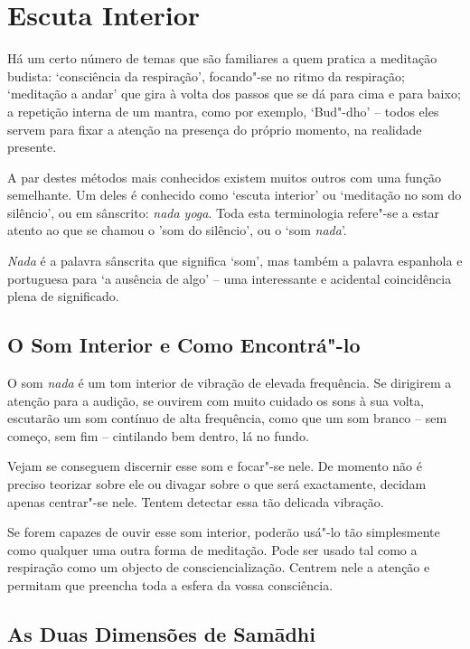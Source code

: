 \chapter{Escuta Interior}

Há um certo número de temas que são familiares a quem pratica a
meditação budista: `consciência da respiração', focando"-se no ritmo da
respiração; `meditação a andar' que gira à volta dos passos que se dá
para cima e para baixo; a repetição interna de um mantra, como por
exemplo, `Bud"-dho' -- todos eles servem para fixar a atenção na presença
do próprio momento, na realidade presente.

A par destes métodos mais conhecidos existem muitos outros com uma
função semelhante. Um deles é conhecido como `escuta interior' ou
`meditação no som do silêncio', ou em sânscrito: \emph{nada yoga}. Toda
esta terminologia refere"-se a estar atento ao que se chamou o 'som do
silêncio', ou o `som \emph{nada}'.

\emph{Nada} é a palavra sânscrita que significa `som', mas também a palavra
espanhola e portuguesa para `a ausência de algo' -- uma interessante e acidental
coincidência plena de significado.


\section{O Som Interior e Como Encontrá"-lo}

O som \emph{nada} é um tom interior de vibração de elevada frequência.
Se dirigirem a atenção para a audição, se ouvirem com muito cuidado os
sons à sua volta, escutarão um som contínuo de alta frequência, como que
um som branco -- sem começo, sem fim -- cintilando bem dentro, lá no
fundo.

Vejam se conseguem discernir esse som e focar"-se nele. De momento não é
preciso teorizar sobre ele ou divagar sobre o que será exactamente,
decidam apenas centrar"-se nele. Tentem detectar essa tão delicada
vibração.

Se forem capazes de ouvir esse som interior, poderão usá"-lo tão
simplesmente como qualquer uma outra forma de meditação. Pode ser usado
tal como a respiração como um objecto de consciencialização. Centrem
nele a atenção e permitam que preencha toda a esfera da vossa
consciência.

\section{As Duas Dimensões de Samādhi}

